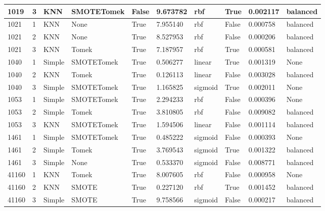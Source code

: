 \documentclass[11pt]{article}
\begin{document}
\begin{table}
\begin{tabular}{llllllllll}
      1019 &       3 &     KNN & SMOTETomek &  False & 9.673782 &     rbf &      True & 0.002117 &     balanced \\
\midrule
      1021 &       1 &     KNN &       None &   True & 7.955140 &     rbf &     False & 0.000758 &     balanced \\
      1021 &       2 &     KNN &       None &   True & 8.527953 &     rbf &     False & 0.000206 &     balanced \\
      1021 &       3 &     KNN &      Tomek &   True & 7.187957 &     rbf &      True & 0.000581 &     balanced \\
\midrule
      1040 &       1 &  Simple & SMOTETomek &   True & 0.506277 &  linear &      True & 0.001319 &         None \\
      1040 &       2 &     KNN &      Tomek &   True & 0.126113 &  linear &     False & 0.003028 &     balanced \\
      1040 &       3 &  Simple & SMOTETomek &   True & 1.165825 & sigmoid &      True & 0.002011 &         None \\
\midrule
      1053 &       1 &  Simple & SMOTETomek &   True & 2.294233 &     rbf &     False & 0.000396 &         None \\
      1053 &       2 &  Simple &      Tomek &   True & 3.810805 &     rbf &     False & 0.009082 &     balanced \\
      1053 &       3 &     KNN & SMOTETomek &   True & 1.594506 &  linear &     False & 0.001114 &     balanced \\
\midrule
      1461 &       1 &  Simple & SMOTETomek &   True & 0.485222 & sigmoid &     False & 0.000393 &         None \\
      1461 &       2 &  Simple &      Tomek &   True & 3.769543 & sigmoid &      True & 0.001322 &     balanced \\
      1461 &       3 &  Simple &       None &   True & 0.533370 & sigmoid &     False & 0.008771 &     balanced \\
\midrule
     41160 &       1 &     KNN &      Tomek &   True & 8.007605 &     rbf &     False & 0.000958 &         None \\
     41160 &       2 &     KNN &      SMOTE &   True & 0.227120 &     rbf &      True & 0.001452 &     balanced \\
     41160 &       3 &  Simple &      SMOTE &   True & 9.758566 & sigmoid &     False & 0.000217 &     balanced \\
\bottomrule
\end{tabular}
\end{table}
\end{document}
